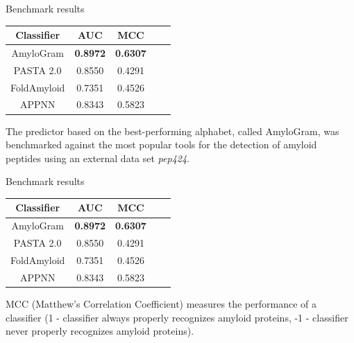 \documentclass{beamer}\usepackage[]{graphicx}\usepackage[]{color}
\begin{document}
\begin{frame}{Benchmark results}

\begin{table}[ht]
\centering

\begin{tabular}{ccccc}
  \toprule
Classifier & AUC & MCC \\ 
  \midrule
AmyloGram & \textbf{0.8972} & \textbf{0.6307} \\ 
  \rowcolor{white}PASTA 2.0 \citep{walsh_pasta_2014} & 0.8550 & 0.4291  \\ 
   FoldAmyloid \citep{garbuzynskiy_foldamyloid:_2010} & 0.7351 & 0.4526  \\ 
  \rowcolor{white}APPNN \citep{familia_prediction_2015} & 0.8343 & 0.5823  \\ 
   \bottomrule
\end{tabular}
\end{table}

The predictor based on the best-performing alphabet, called AmyloGram, was benchmarked against the most popular tools for the detection of amyloid peptides using an external data set \textit{pep424}.

\footnotesize

\end{frame}

\begin{frame}{Benchmark results}

\begin{table}[ht]
\centering

\begin{tabular}{ccccc}
  \toprule
Classifier & AUC & MCC \\ 
  \midrule
AmyloGram & \textbf{0.8972} & \textbf{0.6307} \\ 
  \rowcolor{white}PASTA 2.0 \citep{walsh_pasta_2014} & 0.8550 & 0.4291  \\ 
   FoldAmyloid \citep{garbuzynskiy_foldamyloid:_2010} & 0.7351 & 0.4526  \\ 
  \rowcolor{white}APPNN \citep{familia_prediction_2015} & 0.8343 & 0.5823  \\ 
   \bottomrule
\end{tabular}
\end{table}

MCC (Matthew's Correlation Coefficient) measures the performance of a classifier (1 - classifier always properly recognizes amyloid proteins, -1 - classifier never properly recognizes amyloid proteins).

\footnotesize

\end{frame}
\end{document}
